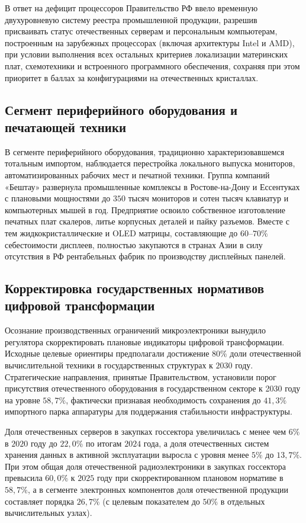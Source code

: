 \documentclass[12pt,a4paper]{article}
\begin{document}
В ответ на дефицит процессоров Правительство РФ ввело временную 
двухуровневую систему реестра промышленной продукции, разрешив 
присваивать статус отечественных серверам и персональным компьютерам, 
построенным на зарубежных процессорах (включая архитектуры Intel и 
AMD), при условии выполнения всех остальных критериев локализации 
материнских плат, схемотехники и встроенного программного обеспечения, 
сохраняя при этом приоритет в баллах за конфигурациями на 
отечественных кристаллах.

\subsection{Сегмент периферийного оборудования и печатающей техники}

В сегменте периферийного оборудования, традиционно характеризовавшемся 
тотальным импортом, наблюдается перестройка локального выпуска 
мониторов, автоматизированных рабочих мест и печатной техники. 
Группа компаний «Бештау» развернула промышленные комплексы в 
Ростове-на-Дону и Ессентуках с плановыми мощностями до 
$350\text{ тысяч}$ мониторов и сотен тысяч клавиатур и компьютерных 
мышей в год. Предприятие освоило собственное изготовление печатных 
плат скалеров, литье корпусных деталей и пайку разъемов. Вместе с 
тем жидкокристаллические и OLED матрицы, составляющие до 
$60\text{--}70\%$ себестоимости дисплеев, полностью закупаются в 
странах Азии в силу отсутствия в РФ рентабельных фабрик по производству 
дисплейных панелей.

\subsection{Корректировка государственных нормативов цифровой трансформации}

Осознание производственных ограничений микроэлектроники вынудило 
регулятора скорректировать плановые индикаторы цифровой трансформации. 
Исходные целевые ориентиры предполагали достижение $80\%$ доли 
отечественной вычислительной техники в государственных структурах к 
$2030$ году. Стратегические направления, принятые Правительством, 
установили порог присутствия отечественного оборудования в 
государственном секторе к 2030 году на уровне $58{,}7\%$, фактически 
признавая необходимость сохранения до $41{,}3\%$ импортного парка 
аппаратуры для поддержания стабильности инфраструктуры.

Доля отечественных серверов в закупках госсектора увеличилась с менее 
чем $6\%$ в $2020$ году до $22{,}0\%$ по итогам $2024$ года, а доля 
отечественных систем хранения данных в активной эксплуатации выросла с уровня менее 
$5\%$ до $13{,}7\%$. При этом общая доля отечественной 
радиоэлектроники в закупках госсектора превысила $60{,}0\%$ к 
$2025$ году при скорректированном плановом нормативе в $58{,}7\%$, а 
в сегменте электронных компонентов доля отечественной продукции 
составляет порядка $26{,}7\%$ (с целевым показателем до $50\%$ в 
отдельных вычислительных узлах).
\end{document}
